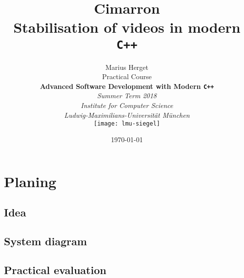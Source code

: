 \newcommand{\pdftitel}{Cimarron Herget 2017}
\newcommand{\autor}{Marius Herget}
\newcommand{\version}{draft} %
\newcommand{\isPrintVersion}{true}




\newcommand{\tbd}[1][null]{
    \ifthenelse{\equal{#1}{null}}
    {\ignorespaces\textit{\impmark\color{orange}\textbf{TBD}}}
    {\ignorespaces\textit{\impmark\color{orange}[TBD: #1]}}
}
\newcommand{\todo}[1][null]{
    \ifthenelse{\equal{#1}{null}}
    {\ignorespaces\textit{\impmark\color{orange}\textbf{TBD}}}
    {\ignorespaces\textit{\impmark\color{orange}[TBD: #1]}}
}



{}
\title{\textbf{Cimarron}\\Stabilisation of videos in modern \texttt{C++}}
\date{\today}
\author{    Marius Herget\\[2em]
            {\small Practical Course}\\
            \textbf{Advanced Software Development with Modern \texttt{C++}}\\
            \textit{Summer Term 2018}\\[2em]
            \textit{Institute for Computer Science}\\
            \textit{Ludwig-Maximilians-Universit\"at M\"unchen}\\[3em]
            \texttt{[image: lmu-siegel]}}
\maketitle
\tableofcontents
\newpage
{}

\chapter{Planing}
\section{Idea}
\section{System diagram}

\section{Practical evaluation}







